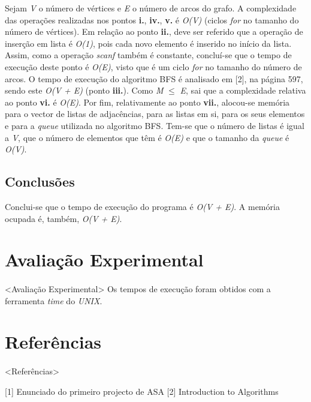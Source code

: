 \documentclass[12pt, a4paper, margin=3cm]{article}
\begin{document}
Sejam \textit{V} o número de vértices e \textit{E} o número de arcos do grafo.
A complexidade das operações realizadas nos pontos \textbf{i.}, \textbf{iv.},
\textbf{v.} é \textit{O(V)} (ciclos \textit{for} no tamanho do número de vértices).
Em relação ao ponto \textbf{ii.}, deve ser referido que a operação de inserção
em lista é \textit{O(1)}, pois cada novo elemento é inserido no início da lista.
Assim, como a operação \textit{scanf} também é constante, concluí-se que o tempo
de execução deste ponto é \textit{O(E)}, visto que é um ciclo \textit{for} no
tamanho do número de arcos.
O tempo de execução do algoritmo BFS é analisado em [2], na página 597, sendo
este \textit{O(V + E)} (ponto \textbf{iii.}).
Como \textit{M} $\leq$ \textit{E}, sai que a complexidade relativa ao
ponto \textbf{vi.} é \textit{O(E)}.
Por fim, relativamente ao ponto \textbf{vii.}, alocou-se memória para o vector
de listas de adjacências, para as listas em si, para os seus elementos e para a
\textit{queue} utilizada no algoritmo BFS. Tem-se que o número de listas é igual
a \textit{V}, que o número de elementos que têm é \textit{O(E)} e que o tamanho
da \textit{queue} é \textit{O(V)}.

\subsection{Conclusões}
Conclui-se que o tempo de execução do programa é \textit{O(V + E)}.
A memória ocupada é, também, \textit{O(V + E)}.


\section{Avaliação Experimental}
\paragraph{}
<Avaliação Experimental>
Os tempos de execução foram obtidos com a ferramenta \textit{time} do
\textit{UNIX}.

\section{Referências}
\paragraph{}
<Referências>

[1] Enunciado do primeiro projecto de ASA
[2] Introduction to Algorithms
\end{document}
